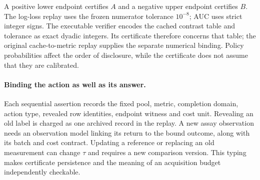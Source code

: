 A positive lower endpoint certifies $A$ and a negative upper endpoint certifies $B$. The log-loss replay uses the frozen numerator tolerance $10^{-8}$; AUC uses strict integer signs. The executable verifier encodes the cached contrast table and tolerance as exact dyadic integers. Its certificate therefore concerns that table; the original cache-to-metric replay supplies the separate numerical binding. Policy probabilities affect the order of disclosure, while the certificate does not assume that they are calibrated.

\paragraph{Binding the action as well as its answer.}
Each sequential assertion records the fixed pool, metric, completion domain, action type, revealed row identities, endpoint witness and cost unit. Revealing an old label is charged as one archived record in the replay. A new assay observation needs an observation model linking its return to the bound outcome, along with its batch and cost contract. Updating a reference or replacing an old measurement can change $\tau$ and requires a new comparison version. This typing makes certificate persistence and the meaning of an acquisition budget independently checkable.
